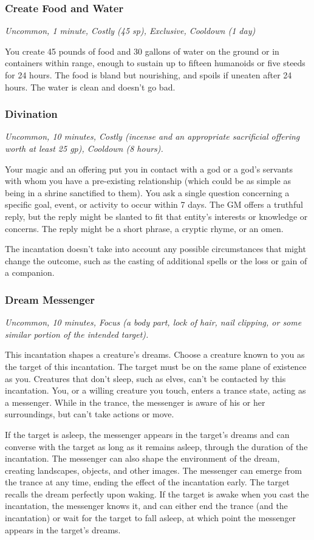 \subsubsection{Create Food and Water}
\textit{Uncommon, 1 minute, Costly (45 sp), Exclusive, Cooldown (1 day)}

You create 45 pounds of food and 30 gallons of water on the ground or in containers within range, enough to sustain up to fifteen humanoids or five steeds for 24 hours. The food is bland but nourishing, and spoils if uneaten after 24 hours. The water is clean and doesn't go bad.

\subsubsection{Divination}
\textit{Uncommon, 10 minutes, Costly (incense and an appropriate sacrificial offering worth at least 25 gp), Cooldown (8 hours).}

Your magic and an offering put you in contact with a god or a god's servants with whom you have a pre-existing relationship (which could be as simple as being in a shrine sanctified to them). You ask a single question concerning a specific goal, event, or activity to occur within 7 days. The GM offers a truthful reply, but the reply might be slanted to fit that entity's interests or knowledge or concerns. The reply might be a short phrase, a cryptic rhyme, or an omen.

The incantation doesn't take into account any possible circumstances that might change the outcome, such as the casting of additional spells or the loss or gain of a companion.

\subsubsection{Dream Messenger}
\textit{Uncommon, 10 minutes, Focus (a body part, lock of hair, nail clipping, or some similar portion of the intended target).}

This incantation shapes a creature's dreams. Choose a creature known to you as the target of this incantation. The target must be on the same plane of existence as you. Creatures that don't sleep, such as elves, can't be contacted by this incantation. You, or a willing creature you touch, enters a trance state, acting as a messenger. While in the trance, the messenger is aware of his or her surroundings, but can't take actions or move.

If the target is asleep, the messenger appears in the target's dreams and can converse with the target as long as it remains asleep, through the duration of the incantation. The messenger can also shape the environment of the dream, creating landscapes, objects, and other images. The messenger can emerge from the trance at any time, ending the effect of the incantation early. The target recalls the dream perfectly upon waking. If the target is awake when you cast the incantation, the messenger knows it, and can either end the trance (and the incantation) or wait for the target to fall asleep, at which point the messenger appears in the target's dreams.

